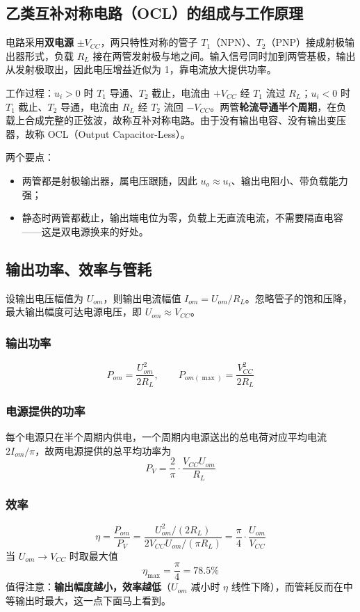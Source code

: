 \subsection{乙类互补对称电路（OCL）的组成与工作原理}
电路采用\textbf{双电源} $\pm V_{CC}$，两只特性对称的管子 $T_1$（NPN）、$T_2$（PNP）接成射极输出器形式，负载 $R_L$ 接在两管发射极与地之间。输入信号同时加到两管基极，输出从发射极取出，因此电压增益近似为 1，靠电流放大提供功率。

工作过程：$u_i>0$ 时 $T_1$ 导通、$T_2$ 截止，电流由 $+V_{CC}$ 经 $T_1$ 流过 $R_L$；$u_i<0$ 时 $T_1$ 截止、$T_2$ 导通，电流由 $R_L$ 经 $T_2$ 流回 $-V_{CC}$。两管\textbf{轮流导通半个周期}，在负载上合成完整的正弦波，故称互补对称电路。由于没有输出电容、没有输出变压器，故称 OCL（Output Capacitor-Less）。

两个要点：
\begin{itemize}
    \item 两管都是射极输出器，属电压跟随，因此 $u_o\approx u_i$、输出电阻小、带负载能力强；
    \item 静态时两管都截止，输出端电位为零，负载上无直流电流，不需要隔直电容——这是双电源换来的好处。
\end{itemize}

\subsection{输出功率、效率与管耗}
设输出电压幅值为 $U_{om}$，则输出电流幅值 $I_{om}=U_{om}/R_L$。忽略管子的饱和压降，最大输出幅度可达电源电压，即 $U_{om}\approx V_{CC}$。

\subsubsection{输出功率}
\begin{equation}
P_{om}=\frac{U_{om}^2}{2R_L},\qquad
P_{om(\max)}=\frac{V_{CC}^2}{2R_L}
\end{equation}

\subsubsection{电源提供的功率}
每个电源只在半个周期内供电，一个周期内电源送出的总电荷对应平均电流 $2I_{om}/\pi$，故两电源提供的总平均功率为
\begin{equation}
P_V=\frac{2}{\pi}\cdot\frac{V_{CC}U_{om}}{R_L}
\end{equation}

\subsubsection{效率}
\begin{equation}
\eta=\frac{P_{om}}{P_V}
=\frac{U_{om}^2/(2R_L)}{2V_{CC}U_{om}/(\pi R_L)}
=\frac{\pi}{4}\cdot\frac{U_{om}}{V_{CC}}
\end{equation}
当 $U_{om}\to V_{CC}$ 时取最大值
\begin{equation}
\eta_{\max}=\frac{\pi}{4}=78.5\%
\end{equation}
值得注意：\textbf{输出幅度越小，效率越低}（$U_{om}$ 减小时 $\eta$ 线性下降），而管耗反而在中等输出时最大，这一点下面马上看到。

